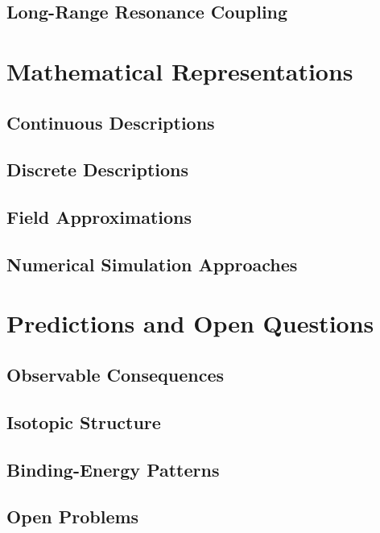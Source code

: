 \documentclass[11pt,a4paper]{article}
\begin{document}
\subsection{Long-Range Resonance Coupling}




\section{Mathematical Representations}

\subsection{Continuous Descriptions}
\subsection{Discrete Descriptions}
\subsection{Field Approximations}
\subsection{Numerical Simulation Approaches}



\section{Predictions and Open Questions}

\subsection{Observable Consequences}
\subsection{Isotopic Structure}
\subsection{Binding-Energy Patterns}
\subsection{Open Problems}
\end{document}
